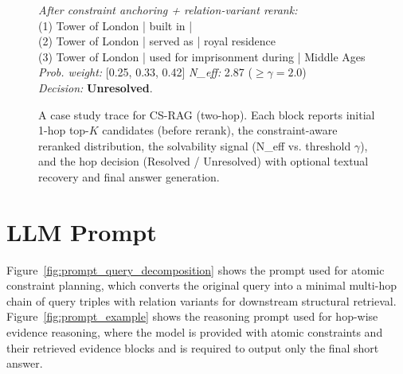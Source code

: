 \documentclass{article}
\theoremstyle{plain}
\theoremstyle{definition}
\theoremstyle{remark}
\begin{document}
\begin{figure}[h]
{{{{\textit{After constraint anchoring + relation-variant rerank:}\\
(1) Tower of London \;|\; built in \;|\\
(2) Tower of London \;|\; served as \;|\; royal residence\\
(3) Tower of London \;|\; used for imprisonment during \;|\; Middle Ages\\
\textit{Prob. weight:} [0.25, 0.33, 0.42] \quad \textit{N\_eff:} 2.87 \;(\(\ge \gamma=2.0\))\\

\textit{Decision:} \textbf{Unresolved}.
}}

\vspace{0.6em}

} %
} %

\caption{A case study trace for \textsc{CS-RAG} (two-hop). Each block reports initial 1-hop top-$K$ candidates (before rerank), the constraint-aware reranked distribution, the solvability signal (N\_eff vs. threshold \(\gamma\)), and the hop decision (Resolved / Unresolved) with optional textual recovery and final answer generation.}
\label{fig:case_study_trace}
\end{figure}


\section{LLM Prompt}

Figure~\ref{fig:prompt_query_decomposition} shows the prompt used for atomic constraint planning, which converts the original query into a minimal multi-hop chain of query triples with relation variants for downstream structural retrieval.
Figure~\ref{fig:prompt_example} shows the reasoning prompt used for hop-wise evidence reasoning, where the model is provided with atomic constraints and their retrieved evidence blocks and is required to output only the final short answer.
\end{document}
